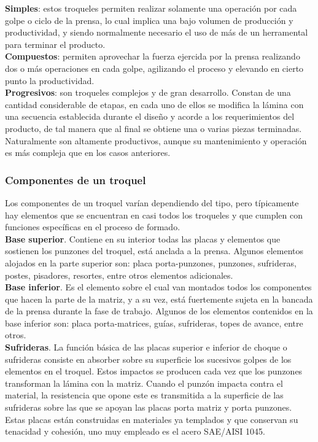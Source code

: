\textbf{Simples}: estos troqueles permiten realizar solamente una operación por cada golpe o 
ciclo de la prensa, lo cual implica una bajo volumen de producción y productividad, y 
siendo normalmente necesario el uso de más de un herramental para terminar el producto.\\

\textbf{Compuestos}: permiten aprovechar la fuerza ejercida por la prensa realizando dos 
o más operaciones en cada golpe, agilizando el proceso y elevando en cierto punto 
la productividad.\\

\textbf{Progresivos}: son troqueles complejos y de gran desarrollo. Constan de una 
cantidad considerable de etapas, en cada uno de ellos se modifica la lámina con una secuencia 
establecida durante el diseño y acorde a los requerimientos del producto, de tal manera 
que al final se obtiene una o varias piezas terminadas. Naturalmente son altamente productivos, 
aunque su mantenimiento y operación es más compleja que en los casos anteriores.

\subsubsection{Componentes de un troquel}

Los componentes de un troquel varían dependiendo del tipo, pero típicamente hay elementos 
que se encuentran en casi todos los troqueles y que cumplen con funciones específicas 
en el proceso de formado.\\

\textbf{Base superior}. Contiene en su interior todas las placas y elementos que sostienen 
los punzones del troquel, está anclada a la prensa. Algunos elementos alojados en 
la parte superior son: placa porta-punzones, punzones, sufrideras, postes, pisadores, resortes, 
entre otros elementos adicionales.\\

\textbf{Base inferior}. Es el elemento sobre el cual van montados todos los componentes 
que hacen la parte de la matriz, y a su vez, está fuertemente sujeta en la bancada 
de la prensa durante la fase de trabajo. Algunos de los elementos contenidos en 
la base inferior son: placa  porta-matrices, guías, sufrideras, topes de avance, entre 
otros.\\

\textbf{Sufrideras}. La función básica de las placas superior e inferior de choque o sufrideras 
consiste en absorber sobre su superficie los sucesivos golpes de los elementos en el troquel. 
Estos impactos se producen cada vez que los punzones transforman la lámina con la matriz. Cuando 
el punzón impacta contra el material, la resistencia que opone este es transmitida a la 
superficie de las sufrideras sobre las que se apoyan las placas porta matriz y porta punzones. 
Estas placas están construidas en materiales ya templados y que conservan su tenacidad y cohesión, 
uno muy empleado es el acero SAE/AISI 1045.\\

